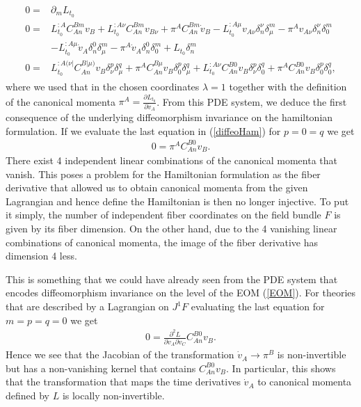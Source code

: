 \documentclass[a4paper,12pt, DIV=14, BCOR=5mm, twoside, headsepline, numbers=noenddot]{scrbook}
\begin{document}
\begin{align}\label{diffeoHam}
    \begin{aligned}
    0 = &\partial_m L_{t_0} \\
    0 = &L_{t_0}^{:A} C_{An}^{Bm} v_B + L_{t_0}^{:A\nu} C_{An}^{B m} v_{B\nu} + \pi^A C_{An}^{B m}\dot{v}_B - L_{t_0}^{:A \mu} v_{A\nu} \delta^{\nu}_n \delta^m_{\mu}
    - \pi^A v_{A\nu} \delta^{\nu}_n \delta^m_{0} \\
    &- L_{t_0}^{:A \mu} \dot{v}_A \delta^0_n \delta^m_{\mu}
    - \pi^A \dot{v}_A \delta^0_n \delta^m_0 + L_{t_0} \delta_n^m \\
    0 = &L_{t_0}^{:A (\nu \vert } C_{An}^{B \vert \mu)} v_B \delta_{\nu}^{p} \delta_{\mu}^{q}
    +\pi^A C_{An}^{B  \mu} v_B \delta_{0}^{p} \delta_{\mu}^{q}
    +L_{t_0}^{:A \nu } C_{An}^{B 0} v_B \delta_{\nu}^{p} \delta_{0}^{q}
    +\pi^A C_{An}^{B  0} v_B \delta_{0}^{p} \delta_{0}^{q},
    \end{aligned}
\end{align}
where we used that in the chosen coordinates $\lambda = 1$ together with the definition of the canonical momenta $\pi^A = \frac{\partial L_{t_0}}{\partial \dot{v}_A}$. 
From this PDE system, we deduce the first consequence of the underlying diffeomorphism invariance on the hamiltonian formulation. If we evaluate the last equation in (\ref{diffeoHam}) for $p=0=q$ we get
\begin{align}\label{ConstrPi}
    0=\pi^A C_{An}^{B0}v_B.
\end{align}
There exist 4 independent linear combinations of the canonical momenta that vanish. This poses a problem for the Hamiltonian formulation as the fiber derivative that allowed us to obtain canonical momenta from the given Lagrangian and hence define the Hamiltonian is then no longer injective. To put it simply, the number of independent fiber coordinates on the field bundle $F$ is given by its fiber dimension. On the other hand, due to the 4 vanishing linear combinations of canonical momenta, the image of the fiber derivative has dimension 4 less.

This is something that we could have already seen from the PDE system that encodes diffeomorphism invariance on the level of the EOM (\ref{EOM}). For theories that are described by a Lagrangian on $J^1F$ evaluating the last equation for $m=p=q=0$ we get 
\begin{align}\label{Constr1}
    0 = \frac{\partial^2 L}{\partial \dot{v}_A \partial \dot{v}_C } C_{An}^{B0} v_B.
\end{align}
Hence we see that the Jacobian of the transformation $\dot{v}_A \rightarrow \pi^B$ is non-invertible but has a non-vanishing kernel that contains $C_{An}^{B0}v_B$. In particular, this shows that the transformation that maps the time derivatives $\dot{v}_A$ to canonical momenta defined by $L$ is locally non-invertible. 
\end{document}
